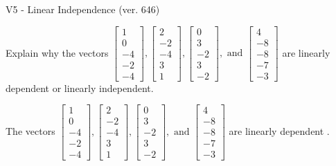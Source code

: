 \begin{exercise}
  \begin{exerciseTitle}V5 - Linear Independence (ver. 646)\end{exerciseTitle}
  \begin{exerciseStatement}
    Explain why the vectors \(\left[\begin{array}{r}
1 \\
0 \\
-4 \\
-2 \\
-4
\end{array}\right] , \left[\begin{array}{r}
2 \\
-2 \\
-4 \\
3 \\
1
\end{array}\right] , \left[\begin{array}{r}
0 \\
3 \\
-2 \\
3 \\
-2
\end{array}\right] , \text{ and } \left[\begin{array}{r}
4 \\
-8 \\
-8 \\
-7 \\
-3
\end{array}\right]\) are linearly dependent or linearly independent.	


  \end{exerciseStatement}
  \begin{exerciseAnswer}
   The vectors \(\left[\begin{array}{r}
1 \\
0 \\
-4 \\
-2 \\
-4
\end{array}\right] , \left[\begin{array}{r}
2 \\
-2 \\
-4 \\
3 \\
1
\end{array}\right] , \left[\begin{array}{r}
0 \\
3 \\
-2 \\
3 \\
-2
\end{array}\right] , \text{ and } \left[\begin{array}{r}
4 \\
-8 \\
-8 \\
-7 \\
-3
\end{array}\right]\) are 
  	 linearly dependent  .
  


  \end{exerciseAnswer}
\end{exercise}